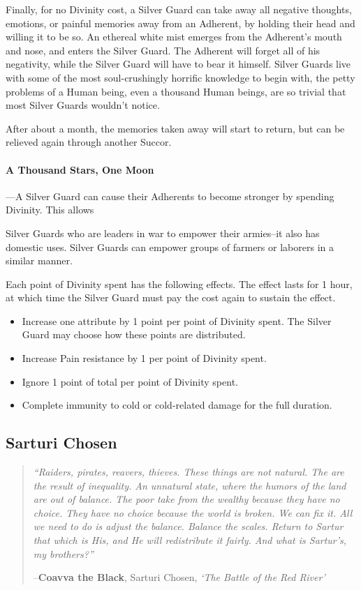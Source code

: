 \documentclass[oneside,11pt,english]{book}
\begin{document}
Finally, for no Divinity cost, a Silver Guard can take away all negative thoughts, emotions, or 
painful memories away from an Adherent, by holding their head and willing it to be so. An 
ethereal white mist emerges from the Adherent's mouth and nose, and enters the Silver Guard. 
The Adherent will forget all of his negativity, while the Silver Guard will have to bear it himself. 
Silver Guards live with some of the most soul-crushingly horrific knowledge to begin with, the 
petty problems of a Human being, even a thousand Human beings, are so trivial that most Silver 
Guards wouldn't notice. 

After about a month, the memories taken away will start to return, but can be relieved again 
through another Succor. 

\paragraph{A Thousand Stars, One Moon}
---\quad A Silver Guard can cause their Adherents to become stronger by spending Divinity. This allows 

Silver Guards who are leaders in war to empower their armies--it also has domestic uses. Silver 
Guards can empower groups of farmers or laborers in a similar manner. 

Each point of Divinity spent has the following effects. The effect lasts for 1 hour, at which time 
the Silver Guard must pay the cost again to sustain the effect. 
\begin{itemize}
\item Increase one attribute by 1 point per point of Divinity spent. The Silver Guard may 
  choose how these points are distributed. 
\item Increase Pain resistance by 1 per point of Divinity spent. 
\item Ignore 1 point of total  per point of Divinity spent. 
\item Complete immunity to cold or cold-related damage for the full duration. 
\end{itemize}
\subsection{Sarturi Chosen}\label{sec:sarturi-chosen}
\begin{quotation}
  {\emph{“Raiders, pirates, reavers, thieves. These things are not natural. The
      are the result of inequality. An unnatural state, where the humors of the
      land are out of balance. The poor take from the wealthy because they have
      no choice. They have no choice because the world is broken. We can fix it.
      All we need to do is adjust the balance. Balance the scales. Return to
      Sartur that which is His, and He will redistribute it fairly. And what is
      Sartur’s, my brothers?”} 

    \hfill--\textbf{Coavva the Black}, Sarturi Chosen, \textit{‘The Battle of the Red River’}}
\end{quotation}
\end{document}
